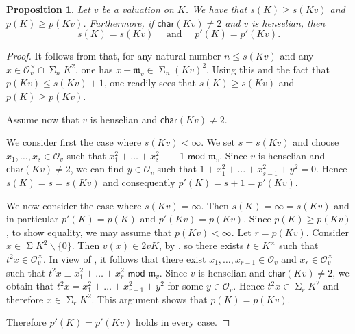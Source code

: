 \documentclass[10pt,a4paper]{amsart}
\newtheorem{prop}{Proposition}
\renewcommand{\bmod}{\,\,\mathsf{mod}\,\,}
\newcommand{\car}{\mathsf{char}}
\renewcommand{\geq}{\geqslant}
\renewcommand{\leq}{\leqslant}
\newcommand{\mc}[1]{\mathcal{#1}}
\newcommand{\mfm}{\mathfrak{m}}
\newcommand{\mg}[1]{#1^{\times}}
\DeclareMathOperator{\newsum}{\mathsf{\Sigma}}
\renewcommand{\setminus}{\smallsetminus}
\newcommand{\sos}[2]{\sum_{#1}\!{#2}^2}
\renewcommand{\sum}{\newsum}
\newcommand{\sums}[1]{\sum\!{#1}^2}
\begin{document}
\begin{prop}\label{inequality p'}
Let $v$ be a valuation on $K$.
We have that  $s(K)\geq s(Kv)$ and $p(K)\geq p(Kv)$.  
Furthermore, if $\car(Kv)\neq 2$ and $v$ is henselian, then 
\[s(K)=s(Kv)\quad \mbox{ and }\quad p'(K)= p'(Kv).\]
\end{prop}

\begin{proof}
It follows from  that, for any natural number $n\leq s(Kv)$ and any $x\in\mg{\mc{O}}_v\cap\sos{n}{K}$, one has $x+\mfm_v\in\sos{n}{(Kv)}$.
Using this and the fact that $p(Kv)\leq s(Kv)+1$, one readily sees that $s(K)\geq s(Kv)$ and $p(K)\geq p(Kv)$. 

Assume now that $v$ is henselian and $\car(Kv)\neq 2$.

We consider first the case where $s(Kv)<\infty$.
We set $s=s(Kv)$ and choose $x_1,\dots,x_s\in {\mc O}_v$ such that $x_1^2+\dots+x_s^2 \equiv -1\bmod \mfm_v$. 
Since $v$ is henselian and $\car(Kv)\neq 2$, we can  find $y\in \mc{O}_v$ such that $1+x_1^2+\dots+x_{s-1}^2+y^2 =0$. Hence $s(K)=s=s(Kv)$ and consequently $p'(K)=s+1=p'(Kv)$.

We now consider the case where $s(Kv)=\infty$. Then $s(K)=\infty=s(Kv)$ and in particular $p'(K)=p(K)$ and $p'(Kv)=p(Kv)$. Since $p(K)\geq p(Kv)$, to show equality, we may assume that $p(Kv)<\infty$. Let $r=p(Kv)$.
Consider $x\in \sums{K}\setminus\{0\}$.
Then $v(x)\in 2 vK$, by , so there exists $t\in \mg K$ such that $t^2x\in\mg{\mc{O}}_v$.
In view of , it follows that there exist $x_1,\dots,x_{r-1}\in \mc{O}_v$ and $x_r\in\mg{\mc{O}}_v$ such that 
$t^2x\equiv x_1^2+\dots+x_r^2\bmod \mfm_v$.
Since $v$ is henselian and $\car(Kv)\neq 2$, we obtain that 
$t^2x=x_1^2+\dots+x_{r-1}^2+y^2$ for some $y\in \mc{O}_v$. Hence $t^2x\in \sos{r}{K}$ and therefore $x\in\sos{r}{K}$.
This argument shows that $p(K)=p(Kv)$. 

Therefore $p'(K)=p'(Kv)$ holds in every case.
\end{proof}
\end{document}
